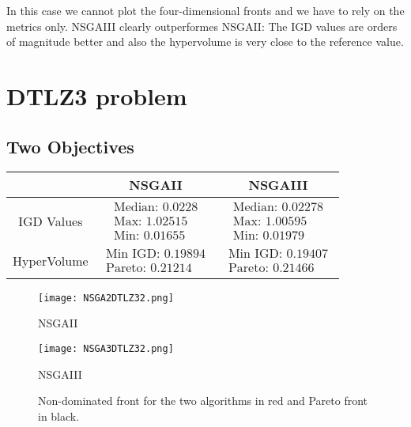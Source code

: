 \documentclass[a4paper,11pt]{article}
\numberwithin{equation}{section}
\begin{document}
\noindent In this case we cannot plot the four-dimensional fronts and we have to rely on the metrics only. NSGAIII clearly outperformes NSGAII: The IGD values are orders of magnitude better and also the hypervolume is very close to the reference value.


\section{DTLZ3 problem}

\subsection{Two Objectives}

\begin{table}[!h]
\begin{center}
\begin{tabular}{|c|c|c|}
\hline
 & NSGAII & NSGAIII \\
\hline
IGD Values &$\begin{array}{l}
\text{Median: 0.0228}\\
\text{Max: 1.02515}\\
\text{Min: 0.01655}\end{array}$&
$\begin{array}{l}
\text{Median: 0.02278}\\
\text{Max: 1.00595}\\
\text{Min: 0.01979}\end{array}$\\
\hline
HyperVolume &$\begin{array}{l}
\text{Min IGD: 0.19894}\\
\text{Pareto: 0.21214}\end{array}$&
$\begin{array}{l}
\text{Min IGD: 0.19407}\\
\text{Pareto: 0.21466}\end{array}$\\
\hline
\end{tabular}
\end{center}
\end{table}

\begin{figure}[h]
        \centering
        \begin{minipage}{0.48\textwidth} 
            \centering
            \texttt{[image: NSGA2DTLZ32.png]} 
            \caption*{NSGAII}
        \end{minipage}
        \hfill
        \begin{minipage}{0.48\textwidth} 
            \centering
            \texttt{[image: NSGA3DTLZ32.png]} 
            \caption*{NSGAIII} 
        \end{minipage}
        \caption{Non-dominated front for the two algorithms in red and Pareto front in black. } 
    \end{figure}
\end{document}
